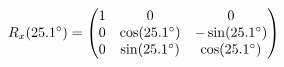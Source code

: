 \documentclass[preview]{standalone}
\begin{document}
\begin{align*}
\special{dvisvgm:raw <g id='unique000'>}R_x(25.1^\circ) = \begin{pmatrix} 1 & 0 & 0 \\ 0 & \cos(25.1^\circ) & -\sin(25.1^\circ) \\ 0 & \sin(25.1^\circ) & \cos(25.1^\circ) \end{pmatrix}\special{dvisvgm:raw </g>}
\end{align*}
\end{document}
